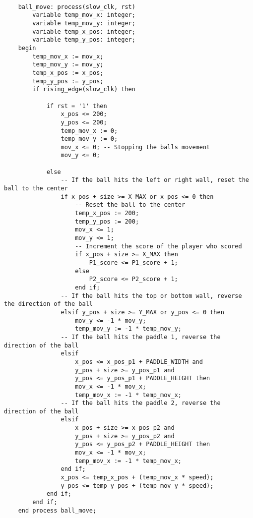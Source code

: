 \documentclass{article}
\begin{document}
\begin{lstlisting}[caption=Movement Processes, label=lst:movement-processes]

    ball_move: process(slow_clk, rst)
        variable temp_mov_x: integer;
        variable temp_mov_y: integer;
        variable temp_x_pos: integer;
        variable temp_y_pos: integer;
    begin
        temp_mov_x := mov_x;
        temp_mov_y := mov_y;
        temp_x_pos := x_pos;
        temp_y_pos := y_pos;
        if rising_edge(slow_clk) then

            if rst = '1' then
                x_pos <= 200;
                y_pos <= 200;
                temp_mov_x := 0;
                temp_mov_y := 0;
                mov_x <= 0; -- Stopping the balls movement
                mov_y <= 0;

            else
                -- If the ball hits the left or right wall, reset the ball to the center
                if x_pos + size >= X_MAX or x_pos <= 0 then
                    -- Reset the ball to the center
                    temp_x_pos := 200;
                    temp_y_pos := 200;
                    mov_x <= 1;
                    mov_y <= 1;
                    -- Increment the score of the player who scored
                    if x_pos + size >= X_MAX then
                        P1_score <= P1_score + 1;
                    else
                        P2_score <= P2_score + 1;
                    end if;
                -- If the ball hits the top or bottom wall, reverse the direction of the ball
                elsif y_pos + size >= Y_MAX or y_pos <= 0 then
                    mov_y <= -1 * mov_y;
                    temp_mov_y := -1 * temp_mov_y;
                -- If the ball hits the paddle 1, reverse the direction of the ball
                elsif
                    x_pos <= x_pos_p1 + PADDLE_WIDTH and
                    y_pos + size >= y_pos_p1 and
                    y_pos <= y_pos_p1 + PADDLE_HEIGHT then
                    mov_x <= -1 * mov_x;
                    temp_mov_x := -1 * temp_mov_x;
                -- If the ball hits the paddle 2, reverse the direction of the ball
                elsif
                    x_pos + size >= x_pos_p2 and
                    y_pos + size >= y_pos_p2 and
                    y_pos <= y_pos_p2 + PADDLE_HEIGHT then
                    mov_x <= -1 * mov_x;
                    temp_mov_x := -1 * temp_mov_x;
                end if;
                x_pos <= temp_x_pos + (temp_mov_x * speed);
                y_pos <= temp_y_pos + (temp_mov_y * speed);
            end if;
        end if;
    end process ball_move;


\end{lstlisting}
\end{document}
